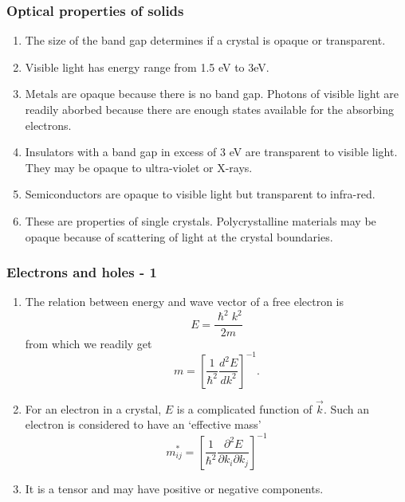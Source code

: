 \documentclass{beamer}
\begin{document}
\begin{frame}
\frametitle{Optical properties of solids}
\begin{enumerate}
\item The size of the band gap determines if a crystal is opaque or transparent.
\item Visible light has energy range from 1.5 eV to 3eV.
\item Metals are opaque because there is no band gap. Photons of visible light
are readily aborbed because there are enough states available for the absorbing
electrons.
\item Insulators with a band gap in excess of 3 eV are transparent to visible
light. They may be opaque to ultra-violet or X-rays.
\item Semiconductors are opaque to visible light but transparent to infra-red.
\item These are properties of single crystals. Polycrystalline materials may be
opaque because of scattering of light at the crystal boundaries.
\end{enumerate}
\end{frame}

\begin{frame}
\frametitle{Electrons and holes - 1}
\begin{enumerate}
\item The relation between energy and wave vector of a free electron is
\begin{equation}\label{e1}
E = \frac{\hslash^2 k^2}{2m}
\end{equation}
from which we readily get
\begin{equation}\label{e2}
m = \left[\frac{1}{\hslash^2}\frac{d^2E}{dk^2}\right]^{-1}.
\end{equation}
\item For an electron in a crystal, $E$ is a complicated function of $\vec{k}$.
Such an electron is considered to have an `effective mass'
\begin{equation}\label{e3}
m^\ast_{ij} = \left[\frac{1}{\hslash^2}
  \frac{\partial^2E}{\partial k_i \partial k_j}\right]^{-1}
\end{equation}
\item It is a tensor and may have positive or negative components.
\end{enumerate}
\end{frame}
\end{document}
